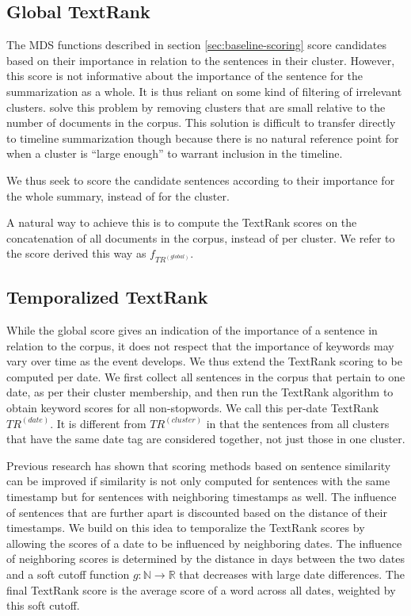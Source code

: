 \documentclass[a4paper,BCOR=10mm]{report}
\numberwithin{lemma}{chapter}
\numberwithin{definition}{chapter}
\begin{document}
\subsection{Global TextRank}

The MDS functions described in section \ref{sec:baseline-scoring} score candidates based on their importance in relation to the sentences in their cluster.
However, this score is not informative about the importance of the sentence for the summarization as a whole.
It is thus reliant on some kind of filtering of irrelevant clusters. \citet{banerjee} solve this problem by removing clusters that are small relative to the number of documents in the corpus. This solution is difficult to transfer directly to timeline summarization though because there is no natural reference point for when a cluster is ``large enough'' to warrant inclusion in the timeline.

We thus seek to score the candidate sentences according to their importance for the whole summary, instead of for the cluster.

A natural way to achieve this is to compute the TextRank \citep{textrank} scores on the concatenation of all documents in the corpus, instead of per cluster.
We refer to the score derived this way as $f_{TR^{(global)}}$.

\subsection{Temporalized TextRank}

While the global score gives an indication of the importance of a sentence in relation to the corpus, it does not respect that the importance of keywords may vary over time as the event develops.
We thus extend the TextRank scoring to be computed per date. We first collect all sentences in the corpus that pertain to one date, as per their cluster membership, and then run the TextRank algorithm to obtain keyword scores for all non-stopwords. We call this per-date TextRank $TR^{(date)}$.
It is different from $TR^{(cluster)}$ in that the sentences from all clusters that have the same date tag are considered together, not just those in one cluster.

Previous research \citep{yan-trans, markert} has shown that scoring methods based on sentence similarity can be improved if similarity is not only computed for sentences with the same timestamp but for sentences with neighboring timestamps as well. The influence of sentences that are further apart is discounted based on the distance of their timestamps.
We build on this idea to temporalize the TextRank scores by allowing the scores of a date to be influenced by neighboring dates. The influence of neighboring scores is determined by the distance in days between the two dates and a soft cutoff function $g: \mathbb{N} \rightarrow \mathbb{R}$ that decreases with large date differences.
The final TextRank score is the average score of a word across all dates, weighted by this soft cutoff.
\end{document}
